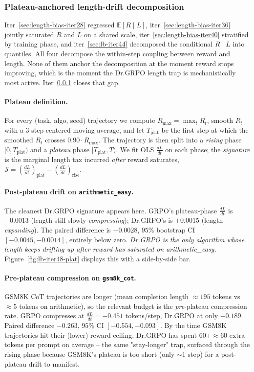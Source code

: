 \documentclass{article}
\newcommand{\E}{\mathbb{E}}
\newcommand{\task}{\textsf{task}}
\newcommand{\algo}{\textsf{algo}}
\newcommand{\seed}{\textsf{seed}}
\newcommand{\tplat}{T_{\text{plat}}}
\providecommand{\signature}{\ensuremath{\mathcal{S}}}
\begin{document}
\subsubsection{Plateau-anchored length-drift decomposition}\label{sec:lb-iter48}

Iter~\ref{sec:length-bias-iter28} regressed $\E[R\mid L]$, iter~\ref{sec:length-bias-iter36}
jointly saturated $R$ and $L$ on a shared scale, iter~\ref{sec:length-bias-iter40}
stratified by training phase, and iter~\ref{sec:lb-iter44} decomposed the
conditional $R\mid L$ into quantiles. All four decompose the within-step
coupling between reward and length. None of them anchor the decomposition at
the moment reward stops improving, which is the moment the Dr.GRPO length
trap is mechanistically most active. Iter~\ref{sec:lb-iter48} closes that gap.

\paragraph{Plateau definition.}
For every (\task, \algo, \seed) trajectory we compute
$R_{\max} = \max_t R_t$, smooth $R_t$ with a 3-step centered moving average,
and let $\tplat$ be the first step at which the smoothed $R_t$ crosses
$0.90 \cdot R_{\max}$. The trajectory is then split into a \emph{rising}
phase $[0, \tplat)$ and a \emph{plateau} phase $[\tplat, T)$. We fit OLS
$\frac{dL}{dt}$ on each phase; the \emph{signature} is the marginal length
tax incurred \emph{after} reward saturates,
$\signature = (\tfrac{dL}{dt})_{\text{plat}} - (\tfrac{dL}{dt})_{\text{rise}}$.

\paragraph{Post-plateau drift on \texttt{arithmetic\_easy}.}
The cleanest Dr.GRPO signature appears here. GRPO's plateau-phase
$\tfrac{dL}{dt}$ is $-0.0013$ (length still slowly \emph{compressing}); Dr.GRPO's
is $+0.0015$ (length \emph{expanding}). The paired difference is
$-0.0028$, $95\%$ bootstrap CI $[-0.0045, -0.0014]$, entirely below zero.
\emph{Dr.GRPO is the only algorithm whose length keeps drifting up after
reward has saturated on arithmetic\_easy.} Figure~\ref{fig:lb-iter48-plat}
displays this with a side-by-side bar.

\paragraph{Pre-plateau compression on \texttt{gsm8k\_cot}.}
GSM8K CoT trajectories are longer (mean completion length $\approx 195$ tokens
vs $\approx 5$ tokens on arithmetic), so the relevant budget is the
\emph{pre}-plateau compression rate. GRPO compresses at $\tfrac{dL}{dt} = -0.451$
tokens/step, Dr.GRPO at only $-0.189$. Paired difference $-0.263$, $95\%$ CI
$[-0.554, -0.093]$. By the time GSM8K trajectories hit their (lower) reward
ceiling, Dr.GRPO has spent $60{+} \approx 60$ extra tokens per prompt on
average -- the same "stay-longer" trap, surfaced through the rising phase
because GSM8K's plateau is too short (only $\sim 1$ step) for a
post-plateau drift to manifest.
\end{document}

